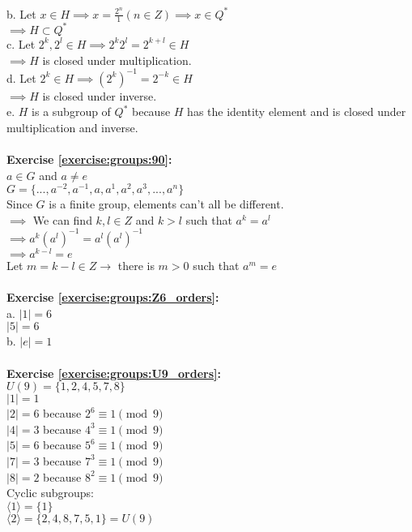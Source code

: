 \\
b. Let $x\in H\implies x=\displaystyle\frac{2^n}{1}(n\in Z)\implies x\in Q^*$\\
$\implies H\subset Q^*$\\
c. Let $2^k,2^l\in H\implies 2^k2^l=2^{k+l}\in H$\\
$\implies H$ is closed under multiplication.\\
d. Let $2^k\in H\implies (2^k)^{-1}=2^{-k}\in H$\\
$\implies H$ is closed under inverse.\\
e. $H$ is a subgroup of $Q^*$ because $H$ has the identity element and is closed under multiplication and inverse.\\
\\
\textbf{Exercise \ref{exercise:groups:90}:}\\
$a\in G$ and $a\neq e$\\
$G=\{...,a^{-2},a^{-1},a,a^1,a^2,a^3,...,a^n\}$\\
Since $G$ is a finite group, elements can't all be different.\\
$\implies$  We can find $k,l\in Z$ and $k>l$ such that $a^k=a^l$\\
$\implies a^k(a^l)^{-1}=a^l(a^l)^{-1}$\\
$\implies a^{k-l}=e$\\
Let $m=k-l\in Z\to$ there is $m>0$ such that $a^m=e$\\
\\
\textbf{Exercise \ref{exercise:groups:Z6_orders}:}\\
a. $|1|=6$\\
$|5|=6$\\
b. $|e|=1$\\
\\
\textbf{Exercise \ref{exercise:groups:U9_orders}:}\\
$U(9)=\{1,2,4,5,7,8\}$\\
$|1|=1$\\
$|2|=6$ because $2^6\equiv 1\pmod{9}$\\
$|4|=3$ because $4^3\equiv 1\pmod{9}$\\
$|5|=6$ because $5^6\equiv 1\pmod{9}$\\
$|7|=3$ because $7^3\equiv 1\pmod{9}$\\
$|8|=2$ because $8^2\equiv 1\pmod{9}$\\
Cyclic subgroups:\\
$\langle1\rangle=\{1\}$\\
$\langle2\rangle=\{2,4,8,7,5,1\}=U(9)$\\
